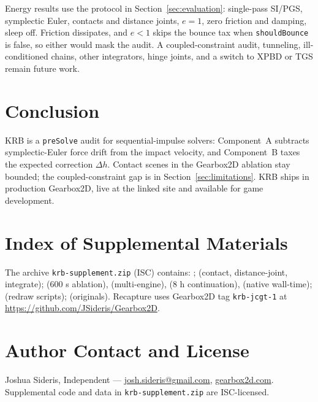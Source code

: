 \documentclass{jcgt}
\begin{document}
Energy results use the protocol in Section~\ref{sec:evaluation}: single-pass SI/PGS, symplectic Euler, contacts and distance joints, $e = 1$, zero friction and damping, sleep off. Friction dissipates, and $e<1$ skips the bounce tax when \texttt{shouldBounce} is false, so either would mask the audit. A coupled-constraint audit, tunneling, ill-conditioned chains, other integrators, hinge joints, and a switch to XPBD or TGS remain future work.

\section{Conclusion}

KRB is a \texttt{preSolve} audit for sequential-impulse solvers: Component~A subtracts symplectic-Euler force drift from the impact velocity, and Component~B taxes the expected correction $\Delta h$. Contact scenes in the Gearbox2D ablation stay bounded; the coupled-constraint gap is in Section~\ref{sec:limitations}. KRB ships in production Gearbox2D, live at the linked site and available for game development.

\small



\vspace{-8pt}
\section*{Index of Supplemental Materials}
\small
{\raggedright
The archive \texttt{krb-supplement.zip} (ISC) contains: ;  (contact, distance-joint, integrate);  (600 s ablation),  (multi-engine),  (8 h continuation),  (native wall-time);  (redraw scripts);  (originals). Recapture uses Gearbox2D tag \texttt{krb-jcgt-1} at \url{https://github.com/JSideris/Gearbox2D}.
\par}

\section*{Author Contact and License}
\noindent Joshua Sideris, Independent --- \href{mailto:josh.sideris@gmail.com}{josh.sideris@gmail.com}, \href{https://gearbox2d.com}{gearbox2d.com}. Supplemental code and data in \texttt{krb-supplement.zip} are ISC-licensed.

\afterdoc
\end{document}
